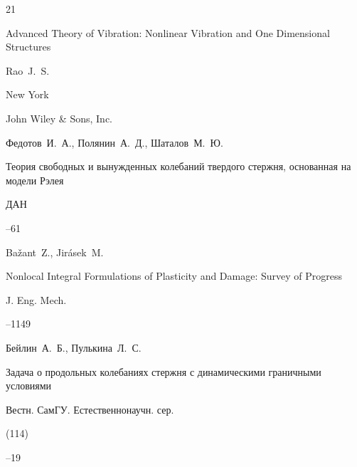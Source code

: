 \begin{thebibliography}{21}

\book Advanced Theory of Vibration: Nonlinear Vibration and One Dimensional Structures

\by Rao~J.~S.

\publaddr New York

\publ John Wiley \& Sons, Inc.








\by Федотов~И.~А., Полянин~А.~Д., Шаталов~М.~Ю.

\paper Теория свободных и вынужденных колебаний твердого стержня, основанная на модели Рэлея

\jour ДАН




--61









\by Ba\v{z}ant~Z., Jir\'{a}sek~M.

\paper Nonlocal Integral Formulations of Plasticity and Damage: Survey of Progress

\jour J. Eng. Mech.




--1149







\by Бейлин~А.~Б., Пулькина~Л.~С.

\paper Задача о продольных колебаниях стержня с динамическими граничными условиями

\jour Вестн. СамГУ. Естественнонаучн. сер.


(114)

--19


\end{thebibliography}
